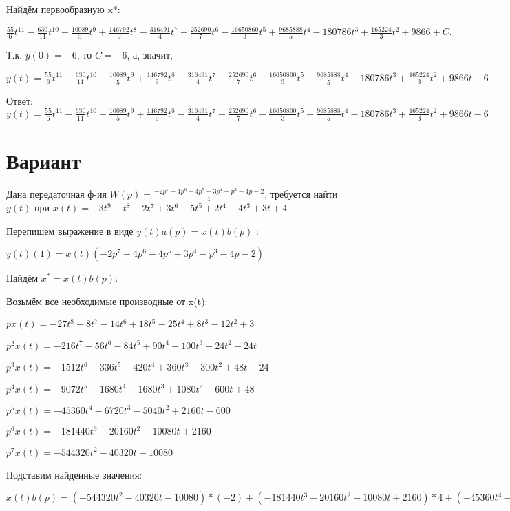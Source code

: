 \documentclass{article}
\begin{document}
{{Найдём первообразную x*:

$\frac{55}{6}t^{11}-\frac{630}{11}t^{10}+\frac{10089}{5}t^{9}+\frac{146792}{9}t^{8}-\frac{316491}{4}t^{7}+\frac{252690}{7}t^{6}-\frac{16650860}{3}t^{5}+\frac{9685888}{5}t^{4}-180786t^{3}+\frac{165224}{3}t^{2}+9866+C.$

Т.к. $y(0)=-6$, то $C=-6$, а, значит, 

$y(t)=\frac{55}{6}t^{11}-\frac{630}{11}t^{10}+\frac{10089}{5}t^{9}+\frac{146792}{9}t^{8}-\frac{316491}{4}t^{7}+\frac{252690}{7}t^{6}-\frac{16650860}{3}t^{5}+\frac{9685888}{5}t^{4}-180786t^{3}+\frac{165224}{3}t^{2}+9866t-6$

Ответ: $y(t) = \frac{55}{6}t^{11}-\frac{630}{11}t^{10}+\frac{10089}{5}t^{9}+\frac{146792}{9}t^{8}-\frac{316491}{4}t^{7}+\frac{252690}{7}t^{6}-\frac{16650860}{3}t^{5}+\frac{9685888}{5}t^{4}-180786t^{3}+\frac{165224}{3}t^{2}+9866t-6$

\section{Вариант}

Дана передаточная ф-ия $W(p)=\frac{-2p^{7}+4p^{6}-4p^{5}+3p^{4}-p^{3}-4p-2}{1}$, требуется найти $y(t)$ при $x(t)=-3t^{9}-t^{8}-2t^{7}+3t^{6}-5t^{5}+2t^{4}-4t^{3}+3t+4$

Перепишем выражение в виде $y(t)a(p)=x(t)b(p)$ :

$y(t)(1)=x(t)(-2p^{7}+4p^{6}-4p^{5}+3p^{4}-p^{3}-4p-2)$

Найдём $x^*=x(t)b(p)$:

Возьмём все необходимые производные от x(t):

$px(t)=-27t^{8}-8t^{7}-14t^{6}+18t^{5}-25t^{4}+8t^{3}-12t^{2}+3$

$p^2x(t)=-216t^{7}-56t^{6}-84t^{5}+90t^{4}-100t^{3}+24t^{2}-24t$

$p^3x(t)=-1512t^{6}-336t^{5}-420t^{4}+360t^{3}-300t^{2}+48t-24$

$p^4x(t)=-9072t^{5}-1680t^{4}-1680t^{3}+1080t^{2}-600t+48$

$p^5x(t)=-45360t^{4}-6720t^{3}-5040t^{2}+2160t-600$

$p^6x(t)=-181440t^{3}-20160t^{2}-10080t+2160$

$p^7x(t)=-544320t^{2}-40320t-10080$

Подставим найденные значения:

$x(t)b(p) = (-544320t^{2}-40320t-10080)*(-2)+(-181440t^{3}-20160t^{2}-10080t+2160)*4+(-45360t^{4}-6720t^{3}-5040t^{2}+2160t-600)*(-4)+(-9072t^{5}-1680t^{4}-1680t^{3}+1080t^{2}-600t+48)*3+(-1512t^{6}-336t^{5}-420t^{4}+360t^{3}-300t^{2}+48t-24)*(-1)+(-27t^{8}-8t^{7}-14t^{6}+18t^{5}-25t^{4}+8t^{3}-12t^{2}+3)*(-4)+(-27t^{8}-8t^{7}-14t^{6}+18t^{5}-25t^{4}+8t^{3}-12t^{2}+3)*(-2)=162t^{8}+48t^{7}+1596t^{6}-26988t^{5}+176970t^{4}-704328t^{3}+1031772t^{2}+29832t$





}}
\end{document}
